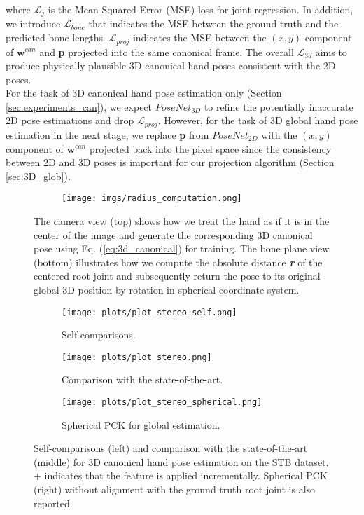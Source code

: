 \documentclass[10pt,twocolumn,letterpaper]{article}
\begin{document}
where $\mathcal{L}_{j}$ is the Mean Squared Error (MSE) loss for joint regression. In addition, we introduce $\mathcal{L}_{bone}$ that indicates the MSE between the ground truth and the predicted bone lengths. $\mathcal{L}_{proj}$ indicates the MSE between the $(x, y)$ component of $\textbf{w}^{can}$ and \textbf{p} projected into the same canonical frame. The overall $\mathcal{L}_{3d}$ aims to produce physically plausible 3D canonical hand poses consistent with the 2D poses.\\
\indent For the task of 3D canonical hand pose estimation only (Section \ref{sec:experiments_can}), we expect \textit{$PoseNet_{3D}$} to refine the potentially inaccurate 2D pose estimations and drop $\mathcal{L}_{proj}$. However, for the task of 3D global hand pose estimation in the next stage, we replace \textbf{p} from \textit{$PoseNet_{2D}$} with the $(x, y)$ component of $\textbf{w}^{can}$ projected back into the pixel space since the consistency between 2D and 3D poses is important for our projection algorithm (Section \ref{sec:3D_glob}).
\begin{figure}[t]
  \centering
  \begin{subfigure}[b]{0.9\linewidth}
    \texttt{[image: imgs/radius\_computation.png]}
  \end{subfigure}
  \caption{The camera view (top) shows how we treat the hand as if it is in the center of the image and generate the corresponding 3D canonical pose using Eq. (\ref{eq:3d_canonical}) for training. The bone plane view (bottom) illustrates how we compute the absolute distance \textbf{\textit{r}} of the centered root joint and subsequently return the pose to its original global 3D position by rotation in spherical coordinate system.}
  \label{fig:radius_img}
\vspace{-1mm}
\end{figure}
\begin{figure*}[t]
  \centering
  \begin{subfigure}[t]{0.32\linewidth}
\texttt{[image: plots/plot\_stereo\_self.png]}
    \caption{Self-comparisons.}\label{fig:stereo_eval1}
  \end{subfigure}
  \begin{subfigure}[t]{0.32\linewidth}
\texttt{[image: plots/plot\_stereo.png]}
    \caption{Comparison with the state-of-the-art.}\label{fig:stereo_eval2}
  \end{subfigure}
  \begin{subfigure}[t]{0.32\linewidth}
\texttt{[image: plots/plot\_stereo\_spherical.png]}
    \caption{Spherical PCK for global estimation.}\label{fig:stereo_eval3}
  \end{subfigure}
  \vspace{0.2cm}
  \caption{Self-comparisons (left) and comparison with the state-of-the-art (middle) for 3D canonical hand pose estimation on the STB dataset. + indicates that the feature is applied incrementally. Spherical PCK (right) without alignment with the ground truth root joint is also reported.}
\label{fig:plots_eval}
\end{figure*}
\end{document}
